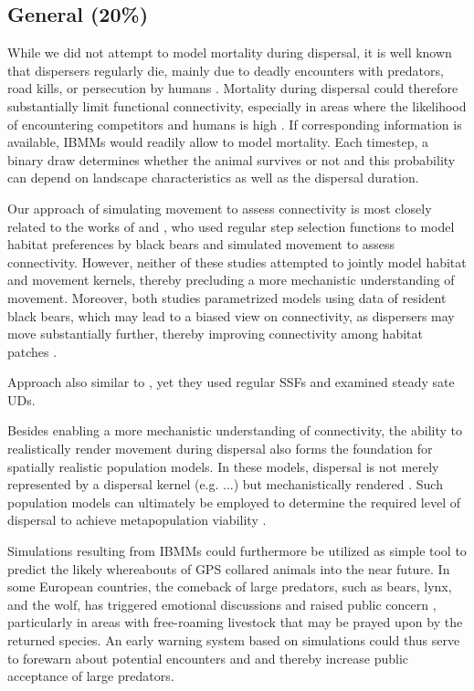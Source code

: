 \documentclass[abstract=on,10pt,a4paper,bibliography=totocnumbered]{article}
\begin{document}
\subsection{General (20\%)}
While we did not attempt to model mortality during dispersal, it is
well known that dispersers regularly die, mainly due to deadly encounters with
predators, road kills, or persecution by humans \citep{Woodroffe.2012,
Behr.2021b}. Mortality during dispersal could therefore substantially limit
functional connectivity, especially in areas where the likelihood of
encountering competitors and humans is high \citep{Cozzi.2020}. If corresponding
information is available, IBMMs would readily allow to model mortality. Each
timestep, a binary draw determines whether the animal survives or not and this
probability can depend on landscape characteristics as well as the dispersal
duration.

Our approach of simulating movement to assess connectivity is most closely
related to the works of \cite{Clark.2015} and \cite{Zeller.2020}, who used
regular step selection functions to model habitat preferences by black bears and
simulated movement to assess connectivity. However, neither of these studies
attempted to jointly model habitat and movement kernels, thereby precluding a
more mechanistic understanding of movement. Moreover, both studies parametrized
models using data of resident black bears, which may lead to a biased view on
connectivity, as dispersers may move substantially further, thereby improving
connectivity among habitat patches \citep{Elliot.2014}.

Approach also similar to \cite{Potts.2013}, yet they used regular SSFs and
examined steady sate UDs.

Besides enabling a more mechanistic understanding of connectivity, the ability
to realistically render movement during dispersal also forms the foundation for
spatially realistic population models. In these models, dispersal is not merely
represented by a dispersal kernel (e.g. ...) but mechanistically rendered
\citep{Revilla.2008}. Such population models can ultimately be employed to
determine the required level of dispersal to achieve metapopulation viability
\citep{DaviesMostert.2012}.

Simulations resulting from IBMMs could furthermore be utilized as simple tool to
predict the likely whereabouts of GPS collared animals into the near future. In
some European countries, the comeback of large predators, such as bears, lynx,
and the wolf, has triggered emotional discussions and raised public concern
\citep{Behr.2017}, particularly in areas with free-roaming livestock that may be
prayed upon by the returned species. An early warning system based on
simulations could thus serve to forewarn about potential encounters and and
thereby increase public acceptance of large predators.
\end{document}

